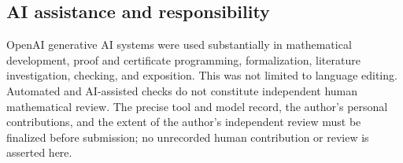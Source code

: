 \documentclass[11pt,letterpaper]{article}
\numberwithin{equation}{section}
\begin{document}
\subsection{AI assistance and responsibility}
OpenAI generative AI systems were used substantially in mathematical development, proof and certificate programming, formalization, literature investigation, checking, and exposition. This was not limited to language editing. Automated and AI-assisted checks do not constitute independent human mathematical review. The precise tool and model record, the author's personal contributions, and the extent of the author's independent review must be finalized before submission; no unrecorded human contribution or review is asserted here.





\end{document}
